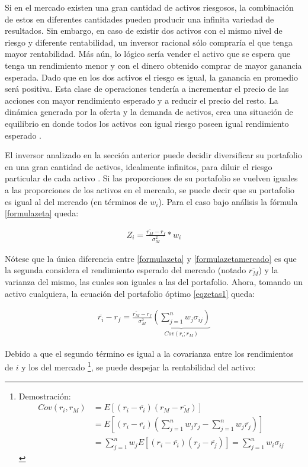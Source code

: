 Si en el mercado existen una gran cantidad de activos riesgosos, la combinación de estos en diferentes cantidades pueden producir una infinita variedad de resultados. Sin embargo, en caso de existir dos activos con el mismo nivel de riesgo y diferente rentabilidad, un inversor racional sólo compraría el que tenga mayor rentabilidad. Más aún, lo lógico sería vender el activo que se espera que tenga un rendimiento menor  y con el dinero obtenido comprar de mayor ganancia esperada. Dado que en los dos activos el riesgo es igual, la ganancia en promedio será positiva. Esta clase de operaciones tendería a incrementar el precio de las acciones con mayor rendimiento esperado y a reducir el precio del resto. La dinámica generada por la oferta y la demanda de activos, crea una situación de equilibrio en donde todos los activos con igual riesgo poseen igual rendimiento esperado \cite{sharp}.

El inversor analizado en la sección anterior puede decidir diversificar su portafolio en una gran cantidad de activos, idealmente infinitos, para diluir el riesgo particular de cada activo \cite{effectofdiversification}. Si las proporciones de su portafolio se vuelven iguales a las proporciones de los activos en el mercado, se puede decir que su portafolio es igual al del mercado (en términos de $w_i$). Para el caso bajo análisis la fórmula \eqref{formulazeta} queda:

\begin{align}
	Z_i = \frac{\overline{r_M} - r_f}{\sigma_M^2} * w_i \label{formulazetamercado}
\end{align}

Nótese que la única diferencia entre \eqref{formulazeta} y \eqref{formulazetamercado} es que la segunda considera el rendimiento esperado del mercado (notado $\overline{r_M}$) y la varianza del mismo, las cuales son iguales a las del portafolio. Ahora, tomando un activo cualquiera, la ecuación del portafolio óptimo \eqref{eqzetas1} queda:

\begin{align}
	\overline{r_i} - r_f = \frac{\overline{r_M} - r_f}{\sigma_M^2} 
		\underbrace{\left( \sum\limits_{j=1}^n w_j \sigma_{ij} \right)}_{Cov(r_i; r_M)}
\end{align}

Debido a que el segundo término es igual a la covarianza entre los rendimientos de $i$ y los del mercado
\footnote{Demostración: \begin{align}
		Cov(r_i, r_M) &= E[(r_i-\overline{r_i})(r_M-\overline{r_M})] \nonumber\\
			&= E[(r_i-\overline{r_i})(\sum\limits_{j=1}^n w_j r_j-\sum\limits_{j=1}^n w_j \overline{r_j})] \nonumber\\
			&= \sum\limits_{j=1}^n w_j E[(r_i-\overline{r_i})(r_j-\overline{r_j})]
			= \sum\limits_{j=1}^n w_i \sigma_{ij} \nonumber
		\end{align}}, se puede despejar la rentabilidad del activo:

